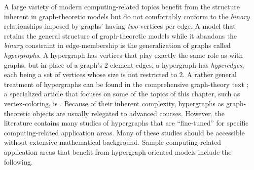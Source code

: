 A large variety of modern computing-related topics benefit from the structure inherent in 
graph-theoretic models but do not comfortably conform to the {\em binary} relationships 
imposed by graphs' having {\em two} vertices per edge.  A model that retains the general 
structure of graph-theoretic models while it abandons the {\em binary} constraint in
edge-membership is the generalization of graphs called {\em hypergraphs}.  A hypergraph has
vertices that play exactly the same role as with graphs, but in place of a graph's $2$-element 
edges, a hypergraph has {\em hyperedges}, each being a set of vertices whose size is not
restricted to $2$.  A rather general treatment of hypergraphs can be found in the comprehensive
graph-theory text \cite{Berge73}; a specialized article that focuses on some of the topics of this 
chapter, such as vertex-coloring, is \cite{Lovasz73}.  Because of their inherent complexity, 
hypergraphs as graph-theoretic objects are usually relegated to advanced courses.
However, the literature contains many studies of hypergraphs that are ``fine-tuned'' for specific
computing-related application areas.  Many of these studies should be accessible without 
extensive mathematical background.  Sample  computing-related application areas that benefit
from hypergraph-oriented models include the following.
